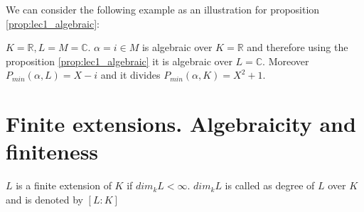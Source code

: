 We can consider the following example as an illustration for
proposition \ref{prop:lec1_algebraic}: 
\begin{myexample}
  $K = \mathbb{R}, L=M=\mathbb{C}$. $\alpha = i \in M$ is algebraic
  over $K = \mathbb{R}$ and therefore using the proposition
  \ref{prop:lec1_algebraic} it is
  algebraic over $L = \mathbb{C}$. Moreover $P_{min}(\alpha, L) = X
  -i$ and it divides $P_{min}(\alpha, K) = X^2 + 1$.
\end{myexample}

\section{Finite extensions. Algebraicity and finiteness}

\begin{definition}
  $L$ is a finite extension of $K$ if $dim_k L < \infty$. $dim_k L$ is
  called as degree of $L$ over $K$ and is denoted by
  $\left[L:K\right]$
  \label{def:finiteextension}
\end{definition}


